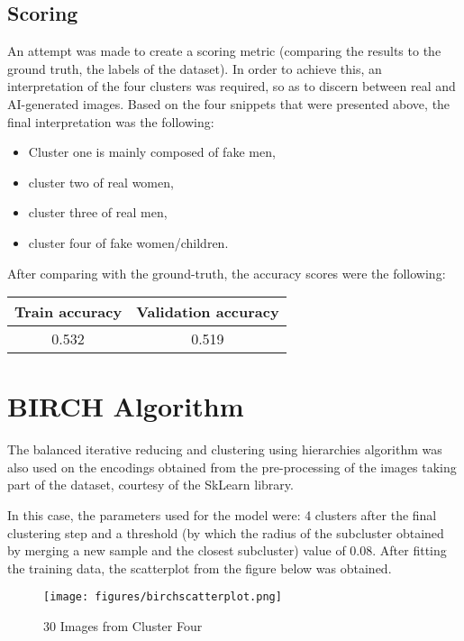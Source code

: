 \documentclass{article}
\begin{document}
\subsection{Scoring}
An attempt was made to create a scoring metric (comparing
the results to the ground truth, the labels of the dataset). In order to achieve this, an interpretation of the four clusters was required, so as to discern between real and AI-generated images. Based on the four snippets that were presented above, the final interpretation was the following:
\begin{itemize}
	\item Cluster one is mainly composed of fake men,
	\item cluster two of real women,
	\item cluster three of real men,
	\item cluster four of fake women/children. 
\end{itemize}

After comparing with the ground-truth, the accuracy scores were the following:

\begin{center}
\begin{tabular}{||c|c||} 
 \hline
 Train accuracy & Validation accuracy \\
 \hline\hline
 0.532 & 0.519 \\
 \hline
\end{tabular}
\end{center}

\section{BIRCH Algorithm}
The balanced iterative reducing and clustering using hierarchies\cite{BIRCH} algorithm was also used on the encodings obtained from the pre-processing of the images taking part of the dataset, courtesy of the SkLearn library\cite{BIRCHskl}.

In this case, the parameters used for the model were: 4 clusters after the final clustering step and a threshold (by which the radius of the subcluster obtained by merging a new sample and the closest subcluster) value of 0.08. After fitting the training data, the scatterplot from the figure below was obtained.

\newpage

\begin{figure}[!ht]
	\centering
	\texttt{[image: figures/birchscatterplot.png]}
	\caption{30 Images from Cluster Four}
\end{figure}
\end{document}
